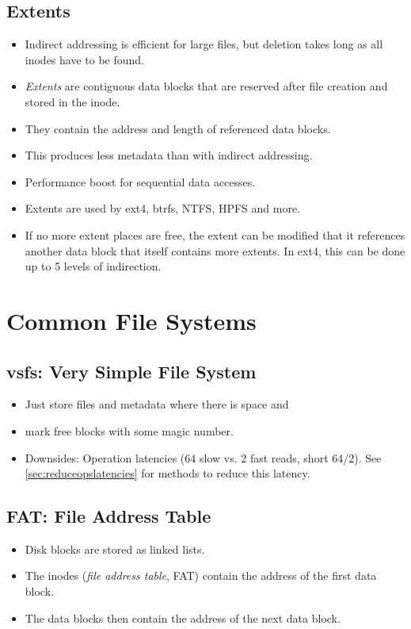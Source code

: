 \documentclass[a4paper, 11pt, accentcolor = tud3b]{tudreport}
\begin{document}
	        \subsection{Extents}
		        \begin{itemize}
		        	\item Indirect addressing is efficient for large files, but deletion takes long as all inodes have to be found.
		        	\item \textit{Extents} are contiguous data blocks that are reserved after file creation and stored in the inode.
		        	\item They contain the address and length of referenced data blocks.
		        	\item This produces less metadata than with indirect addressing.
		        	\item Performance boost for sequential data accesses.
		        	\item Extents are used by ext4, btrfs, NTFS, HPFS and more.
		        	\item If no more extent places are free, the extent can be modified that it references another data block that itself contains more extents. In ext4, this can be done up to 5 levels of indirection.
		        \end{itemize}

        \section{Common File Systems}
            \subsection{vsfs: Very Simple File System}
                \begin{itemize}
                	\item Just store files and metadata where there is space and
                	\item mark free blocks with some magic number.
                	\item Downsides: Operation latencies (64 slow vs. 2 fast reads, short 64/2). See \ref{sec:reduceopslatencies} for methods to reduce this latency.
                \end{itemize}

            \subsection{FAT: File Address Table}
                \begin{itemize}
                	\item Disk blocks are stored as linked lists.
                	\item The inodes (\textit{file address table}, FAT) contain the address of the first data block.
                	\item The data blocks then contain the address of the next data block.
                \end{itemize}
\end{document}
